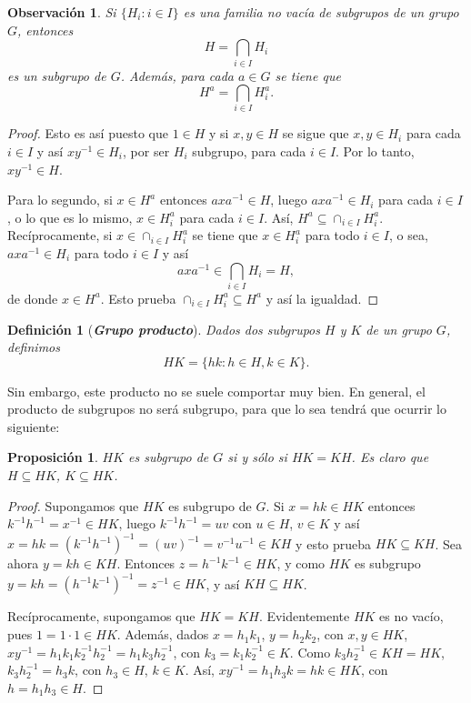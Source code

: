 \documentclass[12pt]{article}
\newtheorem{proposition}[theorem]{Proposición}
\newtheorem{definition}[theorem]{Definición}
\newtheorem{observation}{Observación}[theorem]
\begin{document}
\begin{observation}\label{ob:intGru} Si $\lbrace H_i : i \in I \rbrace$ es una familia no vacía de subgrupos de un grupo $G$, entonces $$H = \bigcap_{i \in I} H_i$$ es un subgrupo de $G$. Además, para cada $a \in G$ se tiene que $$H ^a = \bigcap_{i \in I} H_i^a.$$
\end{observation}
\begin{proof}
Esto es así puesto que $1 \in H$ y si $x,y \in H$ se sigue que $x,y \in H_i$ para cada $i \in I$ y así $xy^{-1} \in H_i$, por ser $H_i$ subgrupo, para cada $i \in I$. Por lo tanto, $xy^{-1} \in H$.

Para lo segundo, si $x \in H^a$ entonces $axa^{-1} \in H$, luego $axa^{-1} \in H_i$ para cada $i \in I$, o lo que es lo mismo, $x \in H_i^a$ para cada $i \in I$. Así, $ H^a \subseteq \cap_{i \in I}H_i^a.$ Recíprocamente, si $x \in \cap_{i \in I} H_i^a$ se tiene que $x \in H_i^a$ para todo $i \in I$, o sea, $axa^{-1} \in H_i$ para todo $i \in I$ y así $$axa^{-1} \in \bigcap_{i \in I} H_i = H,$$ de donde $x \in H^a$. Esto prueba $\cap_{i \in I} H_i^a \subseteq H^a$ y así la igualdad.

\end{proof}

\begin{definition}[\textbf{\textit{Grupo producto}}]Dados dos subgrupos $H$ y $K$ de un grupo $G$, definimos $$HK = \lbrace hk: h \in H, k \in K \rbrace.$$ 
\end{definition}

Sin embargo, este producto no se suele comportar muy bien. En general, el producto de subgrupos no será subgrupo, para que lo sea tendrá que ocurrir lo siguiente:

\begin{proposition}\label{prop:subsSon} $HK$ es subgrupo de $G$ si y sólo si $HK = KH$. Es claro que $H \subseteq HK$, $K \subseteq HK$.
\end{proposition}
\begin{proof}
Supongamos que $HK$ es subgrupo de $G$. Si $x = hk \in HK$ entonces $k^{-1}h^{-1} = x^{-1} \in HK$, luego $k^{-1}h^{-1} = uv$ con $u \in H$, $v \in K$ y así $x = hk = (k^{-1}h^{-1})^{-1} = (uv)^{-1} = v^{-1}u^{-1} \in KH$ y esto prueba $HK \subseteq KH$. Sea ahora $y = kh \in KH$. Entonces $z = h^{-1}k^{-1} \in HK$, y como $HK$ es subgrupo $y = kh = (h^{-1}k^{-1})^{-1} = z^{-1} \in HK$, y así $KH \subseteq HK$.
 
Recíprocamente, supongamos que $HK = KH$. Evidentemente $HK$ es no vacío, pues $1 = 1 \cdot 1 \in HK$. Además, dados $x = h_{1}k_{1}$, $y = h_{2}k_{2}$, con $x,y \in HK$,$xy^{-1} = h_{1}k_{1}k_{2}^{-1}h_{2}^{-1} = h_{1}k_{3}h_{2}^{-1}$, con $k_{3} = k_{1}k_{2}^{-1} \in K$. Como $k_{3}h_{2}^{-1} \in KH = HK$, $k_{3}h_{2}^{-1} = h_{3}k$, con $h_{3} \in H$, $k \in K$. Así, $xy^{-1} = h_{1}h_{3}k = hk \in HK$, con $h = h_{1}h_{3} \in H$.

\end{proof}
\end{document}
